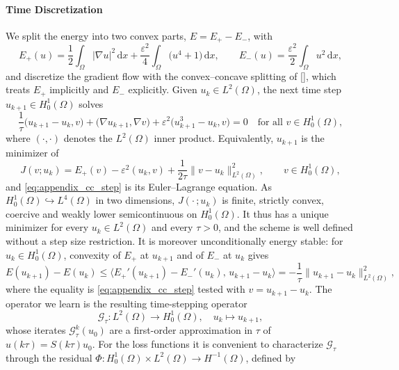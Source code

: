 \documentclass{article} %
\begin{document}
\paragraph{Time Discretization} We split the energy into two convex parts, $E = E_+ - E_-$, with
\begin{equation*}
   E_+(u) = \frac12\int_\Omega |\nabla u|^2\,\mathrm dx + \frac{\varepsilon^2}{4}\int_\Omega \big(u^4 + 1\big)\,\mathrm dx,
   \qquad
   E_-(u) = \frac{\varepsilon^2}{2}\int_\Omega u^2\,\mathrm dx,
\end{equation*}
and discretize the gradient flow with the convex--concave splitting of [], which treats $E_+$ implicitly and $E_-$ explicitly. Given $u_k \in L^2(\Omega)$, the next time step $u_{k+1}\in H^1_0(\Omega)$ solves
\begin{equation}\label{eq:appendix_cc_step}
   \frac1\tau\big(u_{k+1} - u_k, v\big) + \big(\nabla u_{k+1}, \nabla v\big) + \varepsilon^2\big(u_{k+1}^3 - u_k, v\big) = 0
   \quad \text{for all } v\in H^1_0(\Omega),
\end{equation}
where $(\cdot,\cdot)$ denotes the $L^2(\Omega)$ inner product. Equivalently, $u_{k+1}$ is the minimizer of
\begin{equation}\label{eq:appendix_cc_functional}
   J(v; u_k) = E_+(v) - \varepsilon^2 (u_k, v) + \frac{1}{2\tau}\|v - u_k\|^2_{L^2(\Omega)},
   \qquad v \in H^1_0(\Omega),
\end{equation}
and \eqref{eq:appendix_cc_step} is its Euler--Lagrange equation. As $H^1_0(\Omega)\hookrightarrow L^4(\Omega)$ in two dimensions, $J(\cdot\,; u_k)$ is finite, strictly convex, coercive and weakly lower semicontinuous on $H^1_0(\Omega)$. It thus has a unique minimizer for every $u_k\in L^2(\Omega)$ and every $\tau > 0$, and the scheme is well defined without a step size restriction. It is moreover unconditionally energy stable: for $u_k\in H^1_0(\Omega)$, convexity of $E_+$ at $u_{k+1}$ and of $E_-$ at $u_k$ gives
\begin{equation*}
   E(u_{k+1}) - E(u_k)
   \leq
   \big\langle E_+'(u_{k+1}) - E_-'(u_k),\, u_{k+1} - u_k \big\rangle
   =
   -\frac1\tau\|u_{k+1} - u_k\|^2_{L^2(\Omega)},
\end{equation*}
where the equality is \eqref{eq:appendix_cc_step} tested with $v = u_{k+1} - u_k$. The operator we learn is the resulting time-stepping operator
\begin{equation*}
   \mathcal G_\tau : L^2(\Omega) \to H^1_0(\Omega), \quad u_k \mapsto u_{k+1},
\end{equation*}
whose iterates $\mathcal G_\tau^k(u_0)$ are a first-order approximation in $\tau$ of $u(k\tau) = S(k\tau)u_0$. For the loss functions it is convenient to characterize $\mathcal G_\tau$ through the residual $\Phi : H^1_0(\Omega)\times L^2(\Omega) \to H^{-1}(\Omega)$, defined by
\end{document}
